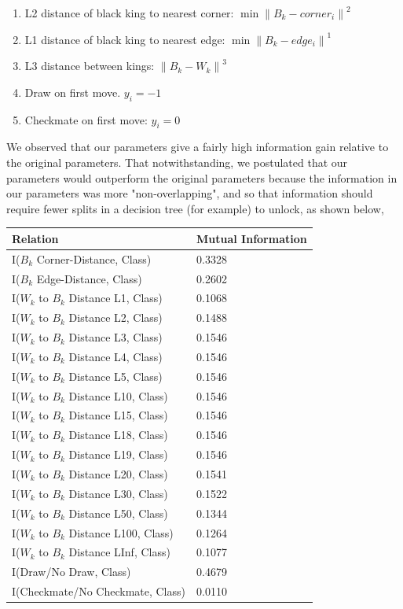 \documentclass[fleqn]{article}
\begin{document}
\begin{enumerate}
\item L2 distance of black king to nearest corner: $\min \left\|B_k-corner_i\right\|^2$
\item L1 distance of black king to nearest edge: $\min \left\|B_k - edge_i\right\|^1$
\item L3 distance between kings: $\left\|B_k - W_k\right\|^3$
\item Draw on first move. $y_i = -1$
\item Checkmate on first move: $y_i = 0$
\end{enumerate}

We observed that our parameters give a fairly high information gain relative to the original parameters. That notwithstanding, we postulated that our parameters would outperform the original parameters because the information in our parameters was more "non-overlapping", and so that information should require fewer splits in a decision tree (for example) to unlock, as shown below,

\hspace{2.25cm}
\begin{tabular}{|l | l|}
\hline
\textbf{Relation} & \textbf{Mutual Information} \\ \hline
I($B_k$ Corner-Distance, Class) & 0.3328 \\ \hline
I($B_k$ Edge-Distance, Class) & 0.2602 \\ \hline
I($W_k$ to $B_k$ Distance L1, Class) & 0.1068 \\ \hline
I($W_k$ to $B_k$ Distance L2, Class) & 0.1488 \\ \hline
I($W_k$ to $B_k$ Distance L3, Class) & 0.1546 \\ \hline
I($W_k$ to $B_k$ Distance L4, Class) & 0.1546 \\ \hline
I($W_k$ to $B_k$ Distance L5, Class) & 0.1546 \\ \hline
I($W_k$ to $B_k$ Distance L10, Class) & 0.1546 \\ \hline
I($W_k$ to $B_k$ Distance L15, Class) & 0.1546 \\ \hline
I($W_k$ to $B_k$ Distance L18, Class) & 0.1546 \\ \hline
I($W_k$ to $B_k$ Distance L19, Class) & 0.1546 \\ \hline
I($W_k$ to $B_k$ Distance L20, Class) & 0.1541 \\ \hline
I($W_k$ to $B_k$ Distance L30, Class) & 0.1522 \\ \hline
I($W_k$ to $B_k$ Distance L50, Class) & 0.1344 \\ \hline
I($W_k$ to $B_k$ Distance L100, Class) & 0.1264 \\ \hline
I($W_k$ to $B_k$ Distance LInf, Class) & 0.1077 \\ \hline
I(Draw/No Draw, Class) & 0.4679 \\ \hline
I(Checkmate/No Checkmate, Class) & 0.0110 \\ \hline
\end{tabular}
 
\end{document}

